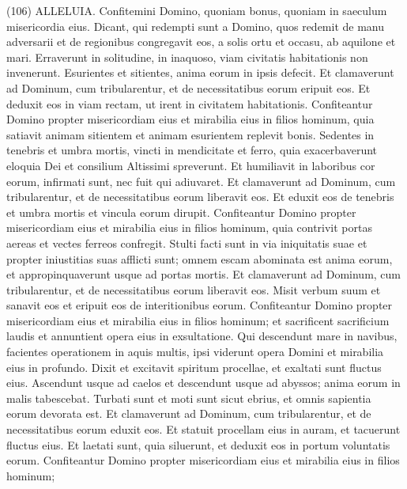 \begin{biblechapter}  (106) 
\verse ALLELUIA. Confitemini Domino, quoniam bonus, quoniam in saeculum misericordia eius. 
\verse Dicant, qui redempti sunt a Domino, quos redemit de manu adversarii 
\verse et de regionibus congregavit eos, a solis ortu et occasu, ab aquilone et mari. 
\verse Erraverunt in solitudine, in inaquoso, viam civitatis habitationis non invenerunt. 
\verse Esurientes et sitientes, anima eorum in ipsis defecit. 
\verse Et clamaverunt ad Dominum, cum tribularentur, et de necessitatibus eorum eripuit eos. 
\verse Et deduxit eos in viam rectam, ut irent in civitatem habitationis. 
\verse Confiteantur Domino propter misericordiam eius et mirabilia eius in filios hominum, 
\verse quia satiavit animam sitientem et animam esurientem replevit bonis. 
\verse Sedentes in tenebris et umbra mortis, vincti in mendicitate et ferro, 
\verse quia exacerbaverunt eloquia Dei et consilium Altissimi spreverunt. 
\verse Et humiliavit in laboribus cor eorum, infirmati sunt, nec fuit qui adiuvaret. 
\verse Et clamaverunt ad Dominum, cum tribularentur, et de necessitatibus eorum liberavit eos. 
\verse Et eduxit eos de tenebris et umbra mortis et vincula eorum dirupit. 
\verse Confiteantur Domino propter misericordiam eius et mirabilia eius in filios hominum, 
\verse quia contrivit portas aereas et vectes ferreos confregit. 
\verse Stulti facti sunt in via iniquitatis suae et propter iniustitias suas afflicti sunt; 
\verse omnem escam abominata est anima eorum, et appropinquaverunt usque ad portas mortis. 
\verse Et clamaverunt ad Dominum, cum tribularentur, et de necessitatibus eorum liberavit eos. 
\verse Misit verbum suum et sanavit eos et eripuit eos de interitionibus eorum. 
\verse Confiteantur Domino propter misericordiam eius et mirabilia eius in filios hominum; 
\verse et sacrificent sacrificium laudis et annuntient opera eius in exsultatione. 
\verse Qui descendunt mare in navibus, facientes operationem in aquis multis, 
\verse ipsi viderunt opera Domini et mirabilia eius in profundo. 
\verse Dixit et excitavit spiritum procellae, et exaltati sunt fluctus eius. 
\verse Ascendunt usque ad caelos et descendunt usque ad abyssos; anima eorum in malis tabescebat. 
\verse Turbati sunt et moti sunt sicut ebrius, et omnis sapientia eorum devorata est. 
\verse Et clamaverunt ad Dominum, cum tribularentur, et de necessitatibus eorum eduxit eos. 
\verse Et statuit procellam eius in auram, et tacuerunt fluctus eius. 
\verse Et laetati sunt, quia siluerunt, et deduxit eos in portum voluntatis eorum. 
\verse Confiteantur Domino propter misericordiam eius et mirabilia eius in filios hominum; 

\end{biblechapter}
